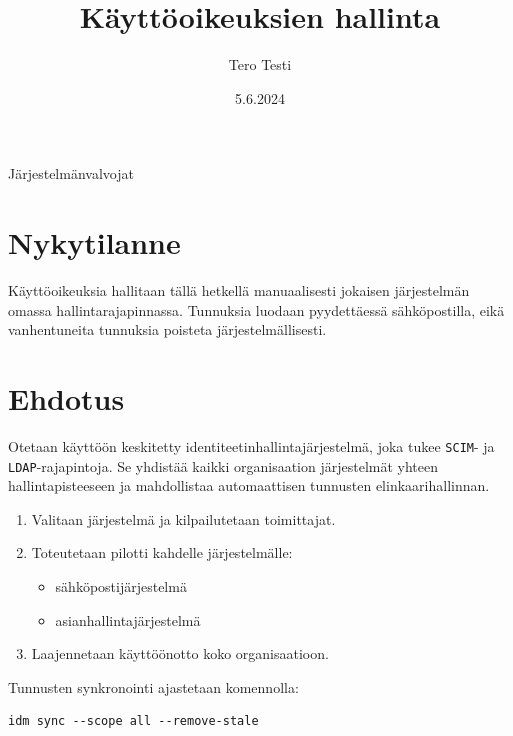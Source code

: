 \documentclass[monospace]{sfs-2487-2024}
\date{5.6.2024}
\author{Tero Testi}
\title{Käyttöoikeuksien hallinta}
\begin{document}
\maketitle


Järjestelmänvalvojat

\section{Nykytilanne}

Käyttöoikeuksia hallitaan tällä hetkellä manuaalisesti jokaisen
järjestelmän omassa hallintarajapinnassa. Tunnuksia luodaan
pyydettäessä sähköpostilla, eikä vanhentuneita tunnuksia poisteta
järjestelmällisesti.

\section{Ehdotus}

Otetaan käyttöön keskitetty identiteetinhallintajärjestelmä, joka
tukee \texttt{SCIM}- ja \texttt{LDAP}-rajapintoja. Se yhdistää kaikki
organisaation järjestelmät yhteen hallintapisteeseen ja mahdollistaa
automaattisen tunnusten elinkaarihallinnan.

\begin{enumerate}
  \item Valitaan järjestelmä ja kilpailutetaan toimittajat.
  \item Toteutetaan pilotti kahdelle järjestelmälle:
    \begin{itemize}
      \item sähköpostijärjestelmä
      \item asianhallintajärjestelmä
    \end{itemize}
  \item Laajennetaan käyttöönotto koko organisaatioon.
\end{enumerate}

Tunnusten synkronointi ajastetaan komennolla:

\begin{verbatim}
idm sync --scope all --remove-stale
\end{verbatim}


\makecontactinfo
\end{document}
